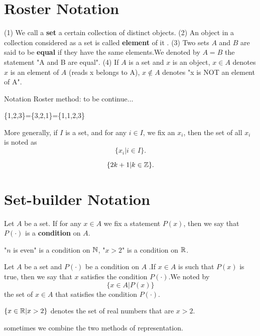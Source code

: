 \documentclass{book}
\numberwithin{equation}{section}
\begin{document}
\section{Roster Notation}
\begin{definitionenv}
    \quad
    \newline
    (1) We call a \textbf{set} a certain collection of distinct objects.
    \newline
    (2) An object in a collection considered as a set is called \textbf{element} of it .
    \newline
    (3) Two sets $A$ and $B$ are said to be \textbf{equal} if they have the same elements.We denoted by $A=B$ the statement "A and B are equal".
    \newline
    (4) If $A$ is a set and $x$ is an object, $x \in A$ denotes $x$ is an element of $A$ (reads x belongs to A), $x \notin A$ denotes "x is NOT an element of A".
\end{definitionenv}
Notation Roster method: to be continue$\dots$
\begin{exampleenv}
    \{1,2,3\}=\{3,2,1\}=\{1,1,2,3\}
\end{exampleenv}
More generally, if $I$ is a set, and for any $i \in I$, we fix an $x_i$, then the set of all $x_i$ is noted as $$\{x_i|i\in I\}.$$
\begin{exampleenv}
    $$\{2k+1|k\in \mathbb{Z}\}.$$
\end{exampleenv}
\section{Set-builder Notation}
\begin{definitionenv}
    Let $A$ be a set. If for any $x\in A $ we fix a statement $P(x)$, then we say that $P(\cdot)$ is a \textbf{condition} on $A$. 
\end{definitionenv}
\begin{exampleenv}
    "$n$ is even" is a condition on $\mathbb{N}$, "$x>2$" is a condition on $\mathbb{R}$.
\end{exampleenv}
\begin{definitionenv}
    Let $A$ be a set and $P(\cdot)$ be a condition on $A$ .If $x\in A$ is such that $P(x)$ is true, then we say that $x$ satisfies the condition $P(\cdot)$.We noted by $$\{x \in A|P(x)\}$$the set of $x\in A$ that satisfies the condition $P(\cdot)$.
\end{definitionenv}
\begin{exampleenv}
    $\{x\in \mathbb{R}|x>2\}$ denotes the set of real numbers that are $x>2$.
\end{exampleenv}
\begin{center}
    sometimes we combine the two methods of representation.
\end{center}
\end{document}
